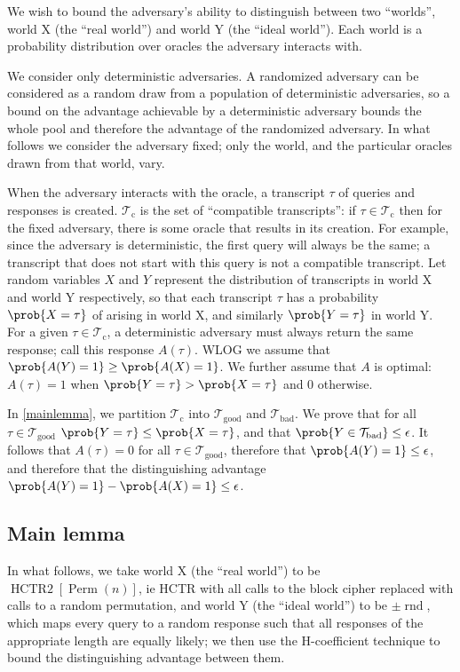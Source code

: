 \documentclass[letterpaper,11pt]{article}
\newcommand*{\Tb}{\mathcal{T}_\mathrm{bad}}
\newcommand*{\Tc}{\mathcal{T}_\mathrm{c}}
\newcommand*{\Tg}{\mathcal{T}_\mathrm{good}}
\DeclareMathOperator{\HCTR}{HCTR2}
\DeclareMathOperator{\Perm}{Perm}
\DeclareMathOperator{\rnd}{rnd}
\begin{document}
We wish to bound the adversary's ability to distinguish between
two ``worlds'', world X (the ``real world'') and world Y (the ``ideal world'').
Each world is a probability distribution over oracles the adversary
interacts with.

We consider only deterministic adversaries.
A randomized adversary can be considered as a random draw
from a population of deterministic adversaries, so
a bound on the advantage achievable by a deterministic
adversary bounds the whole pool and therefore
the advantage of the randomized adversary. In what follows
we consider the adversary fixed; only the world, and the
particular oracles drawn from that world, vary.

When the adversary interacts with the oracle,
a transcript \(\tau\) of queries and responses is created.
\(\Tc\) is the set of ``compatible transcripts'':
if \(\tau \in \Tc\) then for the fixed adversary,
there is some oracle
that results in its creation. For example,
since the adversary is deterministic, the first query
will always be the same; a transcript that
does not start with this query is not a compatible transcript.
Let random variables \(X\) and \(Y\)
represent the distribution of transcripts
in world X and world Y respectively, so that
each transcript \(\tau\) has a probability \(\prob{X = \tau}\)
of arising in world X, and similarly \(\prob{Y = \tau}\) in world Y.
For a given \(\tau \in \Tc\),
a deterministic adversary must always
return the same response; call this response \(A(\tau)\).
WLOG we assume that \(\prob{A(Y) = 1} \geq \prob{A(X) = 1}\).
We further assume that \(A\) is optimal:
\(A(\tau) = 1\)
when \(\prob{Y = \tau} > \prob{X = \tau}\) and 0 otherwise.

In \autoref{mainlemma}, we partition \(\Tc\) into \(\Tg\) and \(\Tb\). 
We prove that for all \(\tau \in \Tg\)
\(\prob{Y = \tau} \leq \prob{X = \tau}\),
and that \(\prob{Y \in \Tb} \leq \epsilon\).
It follows that \(A(\tau) = 0\) for all \(\tau \in \Tg\),
therefore that \(\prob{A(Y) = 1} \leq \epsilon\),
and therefore that the distinguishing advantage
\(\prob{A(Y) = 1} - \prob{A(X) = 1} \leq \epsilon\).

\subsection{Main lemma}\label{mainlemma}
In what follows, we take world X (the ``real world'') 
to be \(\HCTR[\Perm(n)]\),
ie HCTR with all calls to the block cipher
replaced with calls to a random permutation,
and world Y (the ``ideal world'') to be \(\pm\rnd\),
which maps every query to a random response such that
all responses of the appropriate length are equally likely;
we then use the H-coefficient technique to bound
the distinguishing advantage between them.
\end{document}
